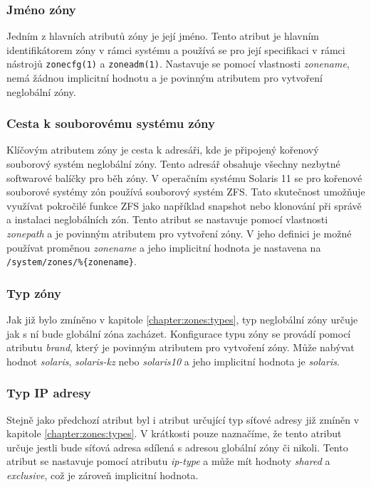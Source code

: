 \subsubsection{Jméno zóny}
\label{chapter:zones:configuration:global_attributes:zonename}
Jedním z hlavních atributů zóny je její jméno. Tento atribut je hlavním identifikátorem zóny v rámci systému a používá se
pro její specifikaci v rámci nástrojů \verb|zonecfg(1)| a \verb|zoneadm(1)|. Nastavuje se pomocí vlastnosti \textit{zonename},
nemá žádnou implicitní hodnotu a je povinným atributem pro vytvoření neglobální zóny.
\subsubsection{Cesta k souborovému systému zóny}
\label{chapter:zones:configuration:global_attributes:zonepath}
Klíčovým atributem zóny je cesta k adresáři, kde je připojený kořenový souborový systém neglobální zóny. Tento adresář obsahuje
všechny nezbytné softwarové balíčky pro běh zóny. V operačním systému Solaris 11 se pro kořenové souborové systémy zón používá
souborový systém ZFS. Tato skutečnost umožňuje využívat pokročilé funkce ZFS jako například snapshot nebo klonování při správě
a instalaci neglobálních zón. Tento atribut se nastavuje pomocí vlastnosti \textit{zonepath} a je povinným atributem pro 
vytvoření zóny. V jeho definici je možné používat proměnou \textit{zonename} a jeho implicitní hodnota je nastavena na
\verb|/system/zones/%{zonename}|.
\subsubsection{Typ zóny}
\label{chapter:zones:configuration:global_attributes:brand}
Jak již bylo zmíněno v kapitole \ref{chapter:zones:types}, typ neglobální zóny určuje jak s ní bude globální zóna zacházet.
Konfigurace typu zóny se provádí pomocí atributu \textit{brand}, který je povinným atributem pro vytvoření zóny. Může nabývat
hodnot \textit{solaris}, \textit{solaris-kz} nebo \textit{solaris10} a jeho implicitní hodnota je \textit{solaris}.
\subsubsection{Typ IP adresy}
\label{chapter:zones:configuration:global_attributes:ip-type}
Stejně jako předchozí atribut byl i atribut určující typ síťové adresy již zmíněn v kapitole \ref{chapter:zones:types}. V
krátkosti pouze naznačíme, že tento atribut určuje jestli bude síťová adresa sdílená s adresou globální zóny či nikoli. Tento
atribut se nastavuje pomocí atributu \textit{ip-type} a může mít hodnoty \textit{shared} a \textit{exclusive}, což je zároveň
implicitní hodnota.
